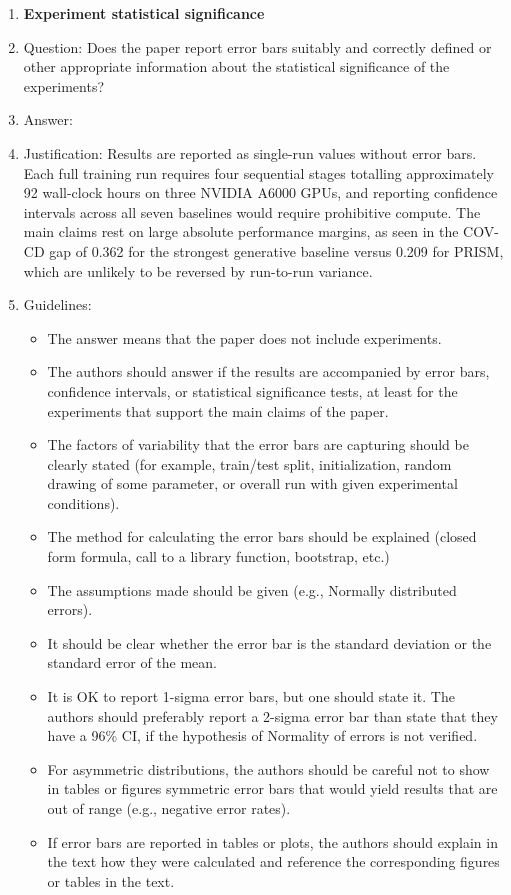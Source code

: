 \begin{enumerate}
\item {\bf Experiment statistical significance}
    \item[] Question: Does the paper report error bars suitably and correctly defined or other appropriate information about the statistical significance of the experiments?
    \item[] Answer: \answerNo{}
    \item[] Justification: Results are reported as single-run values without error bars. Each full training run requires four sequential stages totalling approximately 92 wall-clock hours on three NVIDIA A6000 GPUs, and reporting confidence intervals across all seven baselines would require prohibitive compute. The main claims rest on large absolute performance margins, as seen in the COV-CD gap of 0.362 for the strongest generative baseline versus 0.209 for PRISM, which are unlikely to be reversed by run-to-run variance.
    \item[] Guidelines:
    \begin{itemize}
        \item The answer \answerNA{} means that the paper does not include experiments.
        \item The authors should answer \answerYes{} if the results are accompanied by error bars, confidence intervals, or statistical significance tests, at least for the experiments that support the main claims of the paper.
        \item The factors of variability that the error bars are capturing should be clearly stated (for example, train/test split, initialization, random drawing of some parameter, or overall run with given experimental conditions).
        \item The method for calculating the error bars should be explained (closed form formula, call to a library function, bootstrap, etc.)
        \item The assumptions made should be given (e.g., Normally distributed errors).
        \item It should be clear whether the error bar is the standard deviation or the standard error of the mean.
        \item It is OK to report 1-sigma error bars, but one should state it. The authors should preferably report a 2-sigma error bar than state that they have a 96\% CI, if the hypothesis of Normality of errors is not verified.
        \item For asymmetric distributions, the authors should be careful not to show in tables or figures symmetric error bars that would yield results that are out of range (e.g., negative error rates).
        \item If error bars are reported in tables or plots, the authors should explain in the text how they were calculated and reference the corresponding figures or tables in the text.
    \end{itemize}


\end{enumerate}
